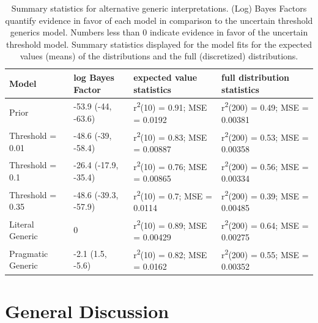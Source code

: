 \documentclass[floatsintext,doc]{apa6}
\begin{document}
\begin{table}[h]
\centering
\begingroup\fontsize{9pt}{10pt}\selectfont
\begin{tabular}{llll}
  \hline
Model & log Bayes Factor & expected value statistics & full distribution statistics \\ 
  \hline
Prior & -53.9 (-44, -63.6) & r\textsuperscript{2}(10) = 0.91; MSE = 0.0192 & r\textsuperscript{2}(200) = 0.49; MSE = 0.00381 \\ 
  Threshold = 0.01 & -48.6 (-39, -58.4) & r\textsuperscript{2}(10) = 0.83; MSE = 0.00887 & r\textsuperscript{2}(200) = 0.53; MSE = 0.00358 \\ 
  Threshold = 0.1 & -26.4 (-17.9, -35.4) & r\textsuperscript{2}(10) = 0.76; MSE = 0.00865 & r\textsuperscript{2}(200) = 0.56; MSE = 0.00334 \\ 
  Threshold = 0.35 & -48.6 (-39.3, -57.9) & r\textsuperscript{2}(10) = 0.7; MSE = 0.0114 & r\textsuperscript{2}(200) = 0.39; MSE = 0.00485 \\ 
  Literal Generic & 0 & r\textsuperscript{2}(10) = 0.89; MSE = 0.00429 & r\textsuperscript{2}(200) = 0.64; MSE = 0.00275 \\ 
  Pragmatic Generic & -2.1 (1.5, -5.6) & r\textsuperscript{2}(10) = 0.82; MSE = 0.0162 & r\textsuperscript{2}(200) = 0.55; MSE = 0.00352 \\ 
   \hline
\end{tabular}
\endgroup
\caption{Summary statistics for alternative generic interpretations. (Log) Bayes Factors quantify evidence in favor of each model in comparison to the uncertain threshold generics model. Numbers less than 0 indicate evidence in favor of the uncertain threshold model. Summary statistics displayed for the model fits for the expected values (means) of the distributions and the full (discretized) distributions.} 
\end{table}

\hypertarget{general-discussion}{%
\section{General Discussion}\label{general-discussion}}
\end{document}
